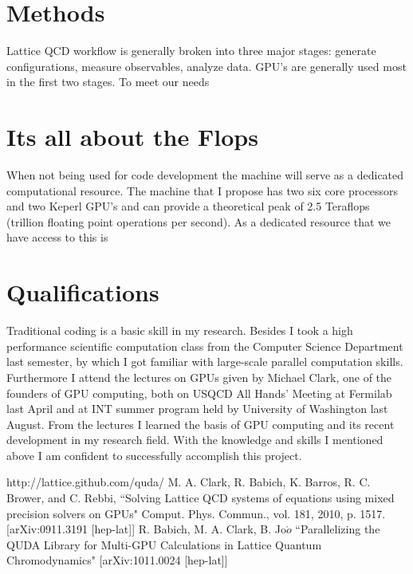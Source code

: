 \documentclass[11pt]{article}
\begin{document}
  \section*{Methods} %
  Lattice QCD workflow is generally broken into three major stages:  generate configurations, measure observables, analyze data.
  GPU's are generally used most in the first two stages.  
  To meet our needs

  
  \section*{Its all about the Flops} %
  When not being used for code development the machine will serve as a dedicated computational resource.  
  The machine that I propose has two six core processors and two Keperl GPU's and can provide a theoretical peak of 2.5 Teraflops (trillion floating point operations per second).  
  As a dedicated resource that we have access to this is 

  \section*{Qualifications} %
Traditional coding is a basic skill in my research. Besides I took a high performance scientific computation class from the Computer Science Department last 
semester, by which I got familiar with large-scale parallel computation skills. Furthermore I attend the lectures on GPUs given by Michael Clark, one of the founders of GPU computing, both on USQCD All Hands' Meeting at Fermilab last April and at INT summer program held by University of Washington last August. From the lectures I learned the basis of GPU computing and its recent development in my research field. With the knowledge and skills I mentioned above I am confident to successfully accomplish this project.

%
\begin{thebibliography}{99}
http://lattice.github.com/quda/
M. A. Clark, R. Babich, K. Barros, R. C. Brower, and C. Rebbi,
``Solving Lattice QCD systems of equations using mixed precision solvers on GPUs" Comput. Phys. Commun., vol. 181, 2010, p. 1517. [arXiv:0911.3191 
[hep-lat]]
R. Babich, M. A. Clark, B. Jo$\acute{o}$ ``Parallelizing the QUDA Library for Multi-GPU Calculations in Lattice Quantum Chromodynamics" [arXiv:1011.0024 
[hep-lat]]

\end{thebibliography}
\end{document}
